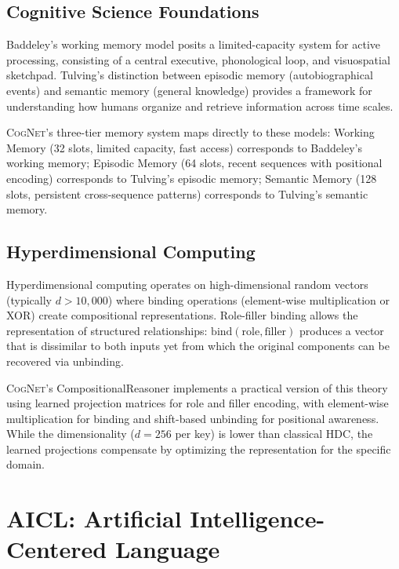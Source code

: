 \documentclass[11pt]{article}
\newcommand{\cognet}{\textsc{CogNet}}
\begin{document}
\subsection{Cognitive Science Foundations}

Baddeley's working memory model \citep{baddeley2012working} posits a limited-capacity system for active processing, consisting of a central executive, phonological loop, and visuospatial sketchpad. Tulving's distinction between episodic memory (autobiographical events) and semantic memory (general knowledge) \citep{tulving1972episodic} provides a framework for understanding how humans organize and retrieve information across time scales.

\cognet{}'s three-tier memory system maps directly to these models: Working Memory (32 slots, limited capacity, fast access) corresponds to Baddeley's working memory; Episodic Memory (64 slots, recent sequences with positional encoding) corresponds to Tulving's episodic memory; Semantic Memory (128 slots, persistent cross-sequence patterns) corresponds to Tulving's semantic memory.

\subsection{Hyperdimensional Computing}

Hyperdimensional computing \citep{kanerva2009hyperdimensional} operates on high-dimensional random vectors (typically $d > 10{,}000$) where binding operations (element-wise multiplication or XOR) create compositional representations. Role-filler binding allows the representation of structured relationships: $\text{bind}(\text{role}, \text{filler})$ produces a vector that is dissimilar to both inputs yet from which the original components can be recovered via unbinding.

\cognet{}'s CompositionalReasoner implements a practical version of this theory using learned projection matrices for role and filler encoding, with element-wise multiplication for binding and shift-based unbinding for positional awareness. While the dimensionality ($d = 256$ per key) is lower than classical HDC, the learned projections compensate by optimizing the representation for the specific domain.

\section{AICL: Artificial Intelligence-Centered Language}
\label{sec:aicl}
\end{document}
